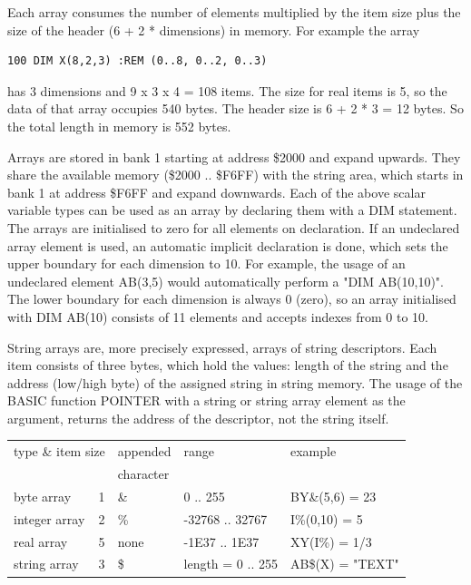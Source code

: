 Each array consumes the number of elements multiplied by the item size
plus the size of the header (6 + 2 * dimensions) in memory.
For example the array
\begin{tcolorbox}[colback=black,coltext=white]
\verbatimfont{\codefont}
\begin{verbatim}
100 DIM X(8,2,3) :REM (0..8, 0..2, 0..3)
\end{verbatim}
\end{tcolorbox}
has 3 dimensions and 9 x 3 x 4 = 108 items.
The size for real items is 5, so the data of that array occupies 540 bytes.
The header size is 6 + 2 * 3 = 12 bytes.
So the total length in memory is 552 bytes.

Arrays are stored in bank 1 starting at address \$2000 and expand upwards.
They share the available memory (\$2000 .. \$F6FF) with the string area,
which starts in bank 1 at address \$F6FF and expand downwards.
Each of the above scalar variable types can be used as an array by declaring
them with a DIM statement. The arrays are initialised to zero for all
elements on declaration. If an undeclared array element is used,
an automatic implicit declaration is done, which sets the upper  boundary
for each dimension to 10. For example, the usage of an undeclared element
AB(3,5) would automatically perform a "DIM AB(10,10)".
The lower boundary for each dimension is always 0 (zero),
so an array initialised with DIM AB(10) consists of 11 elements and accepts indexes from
0 to 10.

String arrays are, more precisely expressed, arrays of string
descriptors. Each item consists of three bytes, which hold
the values: length of the string and the address (low/high byte)
of the assigned string in string memory.
The usage of the BASIC function POINTER with a string or
string array element as the argument, returns the address of the descriptor, not the string itself.

{\ttfamily
\setlength{\tabcolsep}{1mm}
\begin{tabular}{|l|l|l|l|l|}
\hline
\multicolumn{2}{|l|}{type \& item size} & appended  & range    & example  \\
                           &            & character &          &          \\
\hline
byte     array &  1     &    \&    & 0 .. 255        & BY\&(5,6) = 23 \\
integer  array &  2     &    \%    & -32768 .. 32767 & I\%(0,10) = 5    \\
real     array &  5     &   none   & -1E37 .. 1E37   & XY(I\%) = 1/3   \\
string   array &  3     &    \$    & length = 0 .. 255 & AB\$(X) = "TEXT" \\
\hline
\end{tabular}
}

